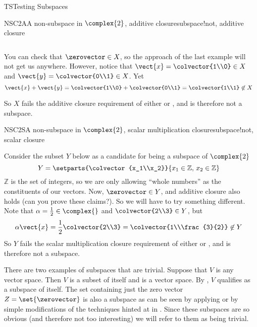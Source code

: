 \begin{subsect}{TS}{Testing Subspaces}
\begin{example}{NSC2A}{A non-subspace in $\complex{2}$, additive closure}{subspace!not, additive closure}
\begin{para}
\begin{equation*}
\end{equation*}
\end{para}
%
\begin{para}You can check that $\zerovector\in X$, so the approach of the last example will not get us anywhere.  However, notice that $\vect{x}=\colvector{1\\0}\in X$ and $\vect{y}=\colvector{0\\1}\in X$.  Yet
%
\begin{equation*}
\vect{x}+\vect{y}=\colvector{1\\0}+\colvector{0\\1}=\colvector{1\\1}\not\in X
\end{equation*}
\end{para}
%
\begin{para}So $X$ fails the additive closure requirement of either  or , and is therefore not a subspace.\end{para}
%
\end{example}
%
%
\begin{example}{NSC2S}{A non-subspace in $\complex{2}$, scalar multiplication closure}{subspace!not, scalar closure}
\begin{para}Consider the subset $Y$ below as a candidate for being a subspace of $\complex{2}$
%
\begin{equation*}
Y=\setparts{\colvector{x_1\\x_2}}{x_1\in{\mathbb Z},\,x_2\in{\mathbb Z}}
\end{equation*}
%
${\mathbb Z}$ is the set of integers, so we are only allowing ``whole numbers'' as the constituents of our vectors.  Now, $\zerovector\in Y$, and additive closure also holds (can you prove these claims?).  So we will have to try something different.  Note that $\alpha = \frac{1}{2}\in\complex{\null}$ and $\colvector{2\\3}\in Y$, but
\begin{equation*}
\alpha\vect{x}=\frac{1}{2}\colvector{2\\3}=\colvector{1\\\frac{3}{2}}\not\in Y
\end{equation*}
So $Y$ fails the scalar multiplication closure requirement of either  or , and is therefore not a subspace.\end{para}
\end{example}
%
\begin{para}There are two examples of subspaces that are trivial.  Suppose that $V$ is any vector space.  Then $V$ is a subset of itself and is a vector space.  By , $V$ qualifies as a subspace of itself.  The set containing just the zero vector $Z=\set{\zerovector}$ is also a subspace as can be seen by applying  or by simple modifications of the techniques hinted at in .  Since these subspaces are so obvious (and therefore not too interesting) we will refer to them as being trivial.\end{para}

\end{subsect}
